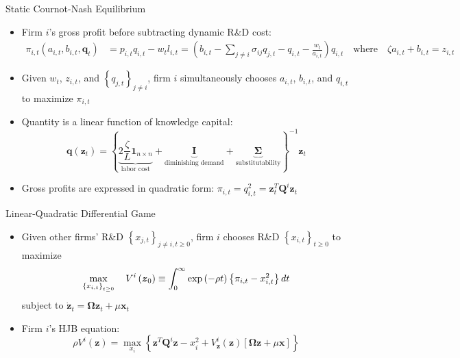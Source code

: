 \documentclass[
  10pt,               %
  aspectratio=169,     %
]{beamer}
\theoremstyle{plain}
\begin{document}
\begin{frame}{Static Cournot-Nash Equilibrium}
  \label{cournot}
  \begin{itemize}
    \item Firm $i$'s gross profit before subtracting dynamic
          R\&D cost:
          \begin{align*}
            \pi_{i,t}\left(a_{i,t},b_{i,t},\bm{q}_{t}\right) & =p_{i,t}q_{i,t}-w_{t}l_{i,t}=\left(b_{i,t}-\sum_{j\neq i}\sigma_{ij}q_{j,t} - q_{i,t} -\frac{w_{t}}{a_{i,t}}\right)q_{i,t}\quad\text{where}\quad\zeta a_{i,t}+b_{i,t}=z_{i,t}
          \end{align*}
    \item Given $w_{t}$, $z_{i,t}$, and $\left\{ q_{j,t}\right\} _{j\neq i}$,
          firm $i$ simultaneously chooses $a_{i,t}$, $b_{i,t}$, and $q_{i,t}$ to maximize
          $\pi_{i,t}$\pause\medskip{}
    \item Quantity is a linear function of knowledge capital:
          \[
            \bm{q}(\bm{z}_{t})=\left\{ \underbrace{2\frac{\zeta}{L}\bm{1}_{n \times n}}_{\text{labor cost}} + \underbrace{\bm{I}}_{\text{diminishing demand}} + \underbrace{\bm{\Sigma}}_{\text{substitutability}}\right\} ^{-1}\bm{z}_{t}
          \]
    \item Gross profits are expressed in quadratic form:
          $\pi_{i,t}=q_{i,t}^2 = \bm{z}_{t}^{T}\bm{Q}^{i}\bm{z}_{t}$
          \hyperlink{Q}{}
  \end{itemize}
\end{frame}
%
\begin{frame}{Linear-Quadratic Differential Game}

  \begin{itemize}
    \item Given other firms' R\&D $\left\{ x_{j,t}\right\} _{j\neq i,t\geq0}$,
          firm $i$ chooses R\&D $\left\{ x_{i,t}\right\} _{t\geq0}$
          to maximize
          \[
            \max_{\left\{ x_{i,t}\right\} _{t\geq0}}\quad V^{i}\left(\text{\ensuremath{\bm{z}}}_{0}\right)\equiv\int_{0}^{\infty}\exp\left(-\rho t\right)\left\{ \pi_{i,t}-x_{i,t}^{2}\right\} dt
          \]
          subject to $\dot{\bm{z}}_{t}=\bm{\Omega}\bm{z}_{t}+\mu\bm{x}_{t}$ \pause\medskip{}
    \item Firm $i$'s HJB equation:
          \[
            \rho V^{i}\left(\bm{z}\right)=\max_{x_{i}}\left\{ \bm{z}^{T}\bm{Q}^{i}\bm{z}-x_{i}^{2}+V_{\bm{z}}^{i}\left(\bm{z}\right)\left[\bm{\Omega}\bm{z}+\mu\bm{x}\right]\right\}
          \]
  \end{itemize}
\end{frame}
\end{document}
